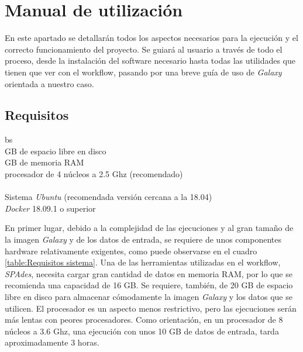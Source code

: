 \chapter{Manual de utilización}
\label{Anexo:manualuso}
En este apartado se detallarán todos los aspectos necesarios para la ejecución y el correcto funcionamiento del proyecto. Se guiará al usuario a través de todo el proceso, desde la instalación del software necesario hasta todas las utilidades que tienen que ver con el workflow, pasando por una breve guía de uso de \textit{Galaxy} orientada a nuestro caso.
\section{Requisitos}

\begin{table}[!ht]

\begin{center}
\begin{tabularx}{\textwidth}{bs}
\hline
{}\\
 GB de espacio libre en disco \\

 GB de memoria RAM \\

\quad procesador de 4 núcleos a 2.5 Ghz (recomendado) \\

\hline
{} \\
\quad Sistema \textit{Ubuntu} (recomendada versión cercana a la 18.04) \\

\quad \textit{Docker} 18.09.1 o superior\\

\hline

\end{tabularx}
\end{center}
\caption{Requisitos del sistema}
\label{table:Requisitos sistema}
\end{table}
En primer lugar, debido a la complejidad de las ejecuciones y al gran tamaño de la imagen \textit{Galaxy} y de los datos de entrada, se requiere de unos componentes hardware relativamente exigentes, como puede observarse en el cuadro \ref{table:Requisitos sistema}. Una de las herramientas utilizadas en el workflow, \textit{SPAdes}, necesita cargar gran cantidad de datos en memoria RAM, por lo que se recomienda una capacidad de 16 GB. Se requiere, también, de 20 GB de espacio libre en disco para almacenar cómodamente la imagen \textit{Galaxy} y los datos que se utilicen. El procesador es un aspecto menos restrictivo, pero las ejecuciones serán más lentas con peores procesadores. Como orientación, en un procesador de 8 núcleos a 3.6 Ghz, una ejecución con unos 10 GB de datos de entrada, tarda aproximadamente 3 horas.

